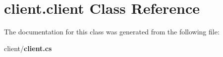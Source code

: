 \section{client.\-client Class Reference}
\label{classclient_1_1client}


The documentation for this class was generated from the following file\-:\begin{DoxyCompactItemize}
\item 
client/{\bf client.\-cs}\end{DoxyCompactItemize}
